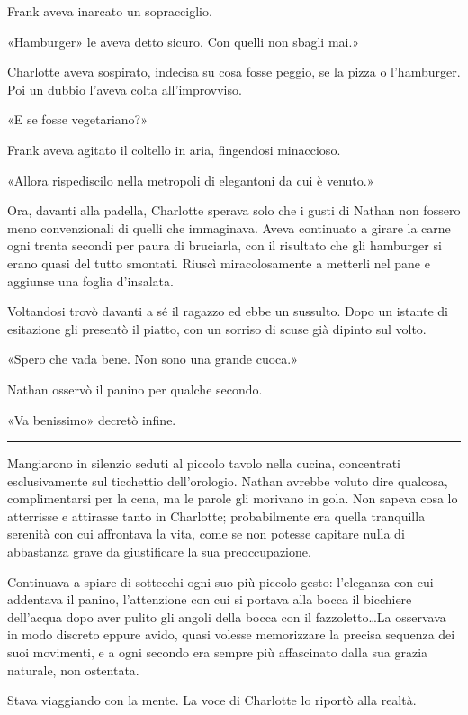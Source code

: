 \documentclass[a4paper,oneside,11pt]{memoir}
\begin{document}
Frank aveva inarcato un sopracciglio.

«Hamburger» le aveva detto sicuro. Con quelli non sbagli mai.»

Charlotte aveva sospirato, indecisa su cosa fosse peggio, se la pizza o
l'hamburger. Poi un dubbio l'aveva colta all'improvviso.

«E se fosse vegetariano?»

Frank aveva agitato il coltello in aria, fingendosi minaccioso.

«Allora rispediscilo nella metropoli di elegantoni da cui è venuto.»

Ora, davanti alla padella, Charlotte sperava solo che i gusti di Nathan non
fossero meno convenzionali di quelli che immaginava. Aveva continuato a girare
la carne ogni trenta secondi per paura di bruciarla, con il risultato che gli
hamburger si erano quasi del tutto smontati. Riuscì miracolosamente a metterli
nel pane e aggiunse una foglia d'insalata.

Voltandosi trovò davanti a sé il ragazzo ed ebbe un sussulto. Dopo un istante di
esitazione gli presentò il piatto, con un sorriso di scuse già dipinto sul
volto.

«Spero che vada bene. Non sono una grande cuoca.»

Nathan osservò il panino per qualche secondo.

«Va benissimo» decretò infine.

\plainbreak{1}

Mangiarono in silenzio seduti al piccolo tavolo nella cucina, concentrati
esclusivamente sul ticchettio dell'orologio. Nathan avrebbe voluto dire
qualcosa, complimentarsi per la cena, ma le parole gli morivano in gola. Non
sapeva cosa lo atterrisse e attirasse tanto in Charlotte; probabilmente era
quella tranquilla serenità con cui affrontava la vita, come se non potesse
capitare nulla di abbastanza grave da giustificare la sua preoccupazione.

Continuava a spiare di sottecchi ogni suo più piccolo gesto: l'eleganza con cui
addentava il panino, l'attenzione con cui si portava alla bocca il bicchiere
dell'acqua dopo aver pulito gli angoli della bocca con il fazzoletto\dots La
osservava in modo discreto eppure avido, quasi volesse memorizzare la precisa
sequenza dei suoi movimenti, e a ogni secondo era sempre più affascinato dalla
sua grazia naturale, non ostentata.

Stava viaggiando con la mente. La voce di Charlotte lo riportò alla realtà.
\end{document}
